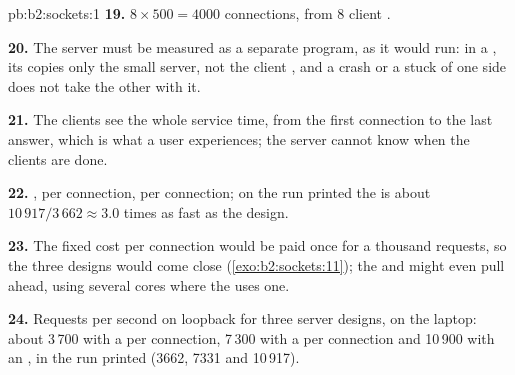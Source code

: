 \begin{solution}{pb:b2:sockets:1}
\textbf{19.} $8 \times 500 = 4000$ connections, from 8 client .

\textbf{20.} The server must be measured as a separate program, as it would run: in a , its 
copies only the small server, not the client , and a crash or a stuck  of one side does not take the other
with it.

\textbf{21.} The clients see the whole service time, from the first connection to the last answer, which is what a
user experiences; the server cannot know when the clients are done.

\textbf{22.} ,  per connection,  per connection; on the run printed the  is about
$10\,917 / 3\,662 \approx 3.0$ times as fast as the  design.

\textbf{23.} The fixed cost per connection would be paid once for a thousand requests, so the three designs would come
close (\cref{exo:b2:sockets:11}); the  and  might even pull ahead, using several cores where the  uses one.

\textbf{24.} Requests per second on loopback for three server designs, on the laptop: about 3\,700 with a  per
connection, 7\,300 with a  per connection and 10\,900 with an , in the run printed
(3662, 7331 and 10\,917).
\end{solution}
